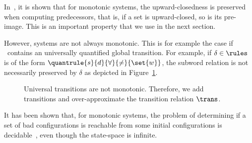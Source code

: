 In~\cite{Parosh:Bengt:Karlis:Tsay:general}, it is shown that for
monotonic systems, the upward-closedness is preserved when computing
predecessors, that is, if a set is upward-closed, so is its
pre-image. This is an important property that we use in the next
section.

%
%
However, systems are not always monotonic.
%
This is for example the case if \ contains an universally
quantified global transition. For example, if $\delta\in\rules$ is of
the form $\quantrule{s}{d}{\forall}{\neq}{\set{w}}$, the subword
relation is not necessarily preserved by $\delta$ as depicted in
Figure~\ref{figure:universal:not:monotonic}.

\noindent%
\begin{wrapfigure}{l}[0pt]{0.6\linewidth}
  \caption{Universal transitions are not monotonic. Therefore, we add
    transitions and over-approximate the transition relation
    $\trans$.}
  \label{figure:universal:not:monotonic}
  \smallskip
\end{wrapfigure}
%
%
%
%
It has been shown that, for monotonic systems, the problem of
determining if a set of bad configurations is reachable from some
initial configurations is decidable~\cite{MTSdecidable}, 
even though the state-space is infinite.

